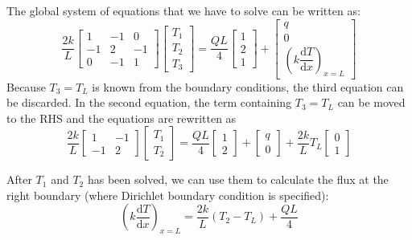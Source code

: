 \documentclass[a4paper,12pt]{article} %
\begin{document}
The global system of equations that we have to solve can be written as:
\begin{equation}
\frac{2k}{L}\begin{bmatrix}
1 & -1 & 0 \\
-1 & 2 & -1 \\
0 & -1 & 1
\end{bmatrix}\begin{bmatrix}
T_{1} \\
T_{2} \\
T_{3}
\end{bmatrix} =
\frac{QL}{4} \begin{bmatrix}
1 \\
2 \\
1
\end{bmatrix} +
\begin{bmatrix}
q \\
0 \\
\left(k\dfrac{\mathrm{d}T}{\mathrm{d}x}\right)_{x=L}
\end{bmatrix}
\end{equation}
Because $T_{3} = T_{L}$ is known from the boundary conditions,
the third equation can be discarded. In the second equation, the term
containing $T_{3} = T_{L}$ can be moved to the RHS and the equations
are rewritten as
\begin{equation}
\frac{2k}{L}\begin{bmatrix}
1 & -1 \\
-1 & 2
\end{bmatrix}\begin{bmatrix}
T_{1} \\
T_{2}
\end{bmatrix} =
\frac{QL}{4} \begin{bmatrix}
1 \\
2
\end{bmatrix} +
\begin{bmatrix}
q \\
0
\end{bmatrix} +
\frac{2k}{L}T_{L}\begin{bmatrix}
0 \\
1
\end{bmatrix}
\end{equation}

After $T_1$ and $T_2$ has been solved, we can use them to calculate the flux
at the right boundary (where Dirichlet boundary condition is specified):
\begin{equation}
\left(k \frac{\mathrm{d}T}{\mathrm{d}x} \right)_{x=L} =
\frac{2k}{L}\left( T_2 - T_L \right) + \frac{QL}{4}
\end{equation}
\end{document}

